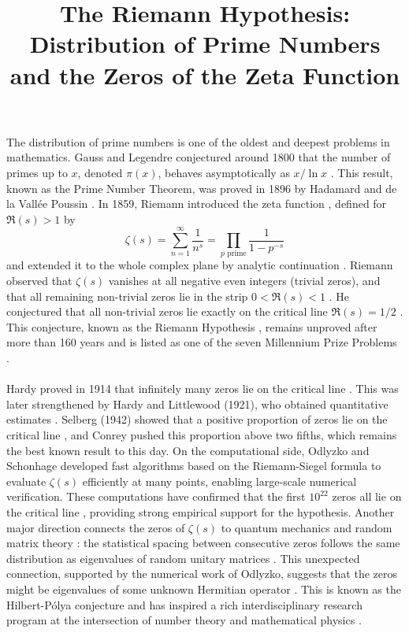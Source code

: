 \documentclass[10pt]{article}
\title{The Riemann Hypothesis: Distribution of Prime Numbers and the Zeros of the Zeta Function}
\date{}
\begin{document}
\maketitle
\paragraph{}
The distribution of prime numbers is one of the oldest and deepest 
problems in mathematics. Gauss and Legendre conjectured around 1800 
that the number of primes up to $x$, denoted $\pi(x)$, behaves 
asymptotically as $x / \ln x$ \cite{IwaniecKowalski2021}. This result, 
known as the Prime Number Theorem, was proved in 1896 by Hadamard and 
de la Vallée Poussin \cite{IwaniecKowalski2021}.
In 1859, Riemann introduced the zeta function \cite{GourdonSebah}, 
defined for $\Re(s) > 1$ by
\[
    \zeta(s) = \sum_{n=1}^{\infty} \frac{1}{n^s} = \prod_{p \text{ prime}} \frac{1}{1-p^{-s}}
\]
and extended it to the whole complex plane by analytic continuation 
\cite{GourdonSebah}.
Riemann observed that $\zeta(s)$ vanishes at all negative even integers 
(trivial zeros), and that all remaining non-trivial zeros lie in the 
strip $0 < \Re(s) < 1$ \cite{GourdonSebah}. He conjectured that all 
non-trivial zeros lie exactly on the critical line $\Re(s) = 1/2$ 
\cite{GourdonSebah}. This conjecture, known as the Riemann Hypothesis 
\cite{CarlsonJaffeWiles2023}, remains unproved after more than 160 years 
and is listed as one of the seven Millennium Prize Problems 
\cite{CarlsonJaffeWiles2023}.
\paragraph{}
Hardy proved in 1914 that infinitely many zeros lie on the critical line 
\cite{IwaniecKowalski2021}. This was later strengthened by Hardy and 
Littlewood (1921), who obtained quantitative estimates 
\cite{IwaniecKowalski2021}. Selberg (1942) showed that a positive 
proportion of zeros lie on the critical line \cite{IwaniecKowalski2021}, 
and Conrey pushed this proportion \cite{Conrey1989} above two fifths, 
which remains the best known result to this day. On the computational 
side, Odlyzko and Schonhage \cite{OdlyzkoSchonhage} developed fast 
algorithms based on the Riemann-Siegel formula \cite{GourdonSebah} to 
evaluate $\zeta(s)$ efficiently at many points, enabling large-scale 
numerical verification. These computations have confirmed that the first 
$10^{22}$ zeros all lie on the critical line \cite{OdlyzkoSchonhage}, 
providing strong empirical support for the hypothesis. Another major 
direction connects the zeros of $\zeta(s)$ to quantum mechanics and 
random matrix theory \cite{BerryKeating1999}: the statistical spacing 
between consecutive zeros follows the same distribution as eigenvalues 
of random unitary matrices \cite{BerryKeating1999}. This unexpected 
connection, supported by the numerical work of Odlyzko, suggests that 
the zeros might be eigenvalues of some unknown Hermitian operator 
\cite{BerryKeating1999}. This is known as the Hilbert-Pólya conjecture 
and has inspired a rich interdisciplinary research program at the 
intersection of number theory and mathematical physics 
\cite{BerryKeating1999}.
\end{document}
